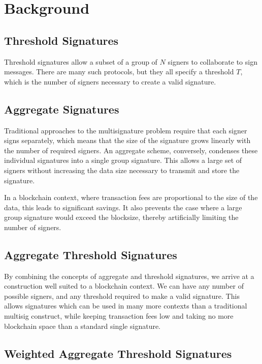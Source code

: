 \documentclass{article}
\begin{document}
\newpage
\onecolumn
\section{
  Background
}

\subsection{
  Threshold Signatures
}

Threshold signatures allow a subset of a group of $N$ signers to collaborate to sign messages.  There are many such protocols, but they all specify a threshold $T$, which is the number of signers necessary to create a valid signature.  

\subsection{
  Aggregate Signatures
}

Traditional approaches to the multisignature problem require that each signer signs separately, which means that the size of the signature grows linearly with the number of required signers.  An aggregate scheme, conversely, condenses these individual signatures into a single group signature.  This allows a large set of signers without increasing the data size necessary to transmit and store the signature.

In a blockchain context, where transaction fees are proportional to the size of the data, this leads to significant savings.  It also prevents the case where a large group signature would exceed the blocksize, thereby artificially limiting the number of signers.

\subsection{
  Aggregate Threshold Signatures
}

By combining the concepts of aggregate and threshold signatures, we arrive at a construction well suited to a blockchain context.  We can have any number of possible signers, and any threshold required to make a valid signature.  This allows signatures which can be used in many more contexts than a traditional multisig construct, while keeping transaction fees low and taking no more blockchain space than a standard single signature.

\subsection{
  Weighted Aggregate Threshold Signatures
}
\end{document}
